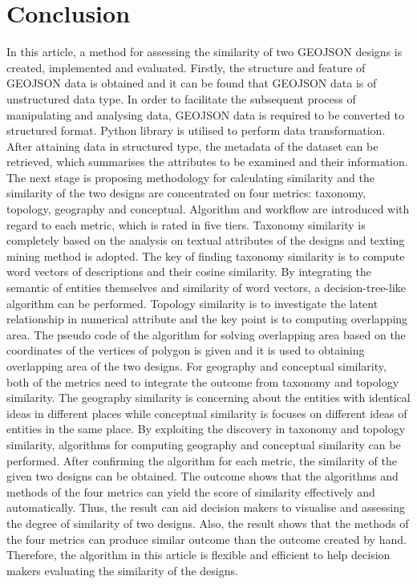 \section*{Conclusion}
In this article, a method for assessing the similarity of two GEOJSON designs is created, implemented and evaluated. Firstly, the structure and feature of GEOJSON data is obtained and it can be found that GEOJSON data is of unstructured data type. In order to facilitate the subsequent process of manipulating and analysing data, GEOJSON data is required to be converted to structured format. Python library is utilised to perform data transformation. After attaining data in structured type, the metadata of the dataset can be retrieved, which summarises the attributes to be examined and their information. The next stage is proposing methodology for calculating similarity and the similarity of the two designs are concentrated on four metrics: taxonomy, topology, geography and conceptual. Algorithm and workflow are introduced with regard to each metric, which is rated in five tiers. Taxonomy similarity is completely based on the analysis on textual attributes of the designs and texting mining method is adopted. The key of finding taxonomy similarity is to compute word vectors of descriptions and their cosine similarity. By integrating the semantic of entities themselves and similarity of word vectors, a decision-tree-like algorithm can be performed. Topology similarity is to investigate the latent relationship in numerical attribute and the key point is to computing overlapping area. The pseudo code of the algorithm for solving overlapping area based on the coordinates of the vertices of polygon is given and it is used to obtaining overlapping area of the two designs. For geography and conceptual similarity, both of the metrics need to integrate the outcome from taxonomy and topology similarity. The geography similarity is concerning about the entities with identical ideas in different places while conceptual similarity is focuses on different ideas of entities in the same place. By exploiting the discovery in taxonomy and topology similarity, algorithms for computing geography and conceptual similarity can be performed. After confirming the algorithm for each metric, the similarity of the given two designs can be obtained. The outcome shows that the algorithms and methods of the four metrics can yield the score of similarity effectively and automatically. Thus, the result can aid decision makers to visualise and assessing the degree of similarity of two designs. Also, the result shows that the methods of the four metrics can produce similar outcome than the outcome created by hand. Therefore, the algorithm in this article is flexible and efficient to help decision makers evaluating the similarity of the designs.







